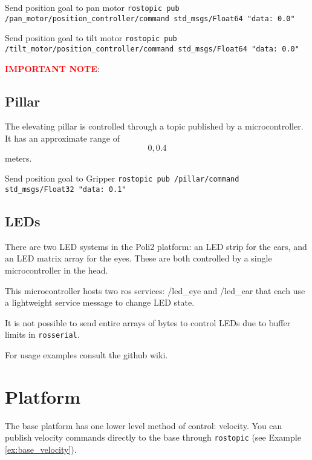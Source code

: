 \begin{example}{Send position goal to pan motor}
  \label{ex:pan_pos_goal}
    \texttt{rostopic pub /pan\_motor/position\_controller/command std\_msgs/Float64 "data: 0.0"} \\
\end{example}

\begin{example}{Send position goal to tilt motor}
  \label{ex:tilt_pos_goal}
    \texttt{rostopic pub /tilt\_motor/position\_controller/command std\_msgs/Float64 "data: 0.0"} \\
\end{example}

\textcolor{red}{\textbf{IMPORTANT NOTE}}: 
\subsection{Pillar}
The elevating pillar is controlled through a topic published by a microcontroller. It has an approximate range of \[0,0.4\] meters.

\begin{example}{Send position goal to Gripper}
  \label{ex:pillar_pos_goal}
    \texttt{rostopic pub /pillar/command std\_msgs/Float32 "data: 0.1"} \\
\end{example}

\subsection{LEDs}
There are two LED systems in the Poli2 platform: an LED strip for the ears, and an LED matrix array for the eyes. 
These are both controlled by a single microcontroller in the head. 

This microcontroller hosts two ros services: /led\_eye and /led\_ear that each use a lightweight service message to change LED state. 

It is not possible to send entire arrays of bytes to control LEDs due to buffer limits in \texttt{rosserial}. 

For usage examples consult the github wiki.

\section{Platform}
The base platform has one lower level method of control: velocity. 
You can publish velocity commands directly to the base through \texttt{rostopic} (see Example \ref{ex:base_velocity}). \\


